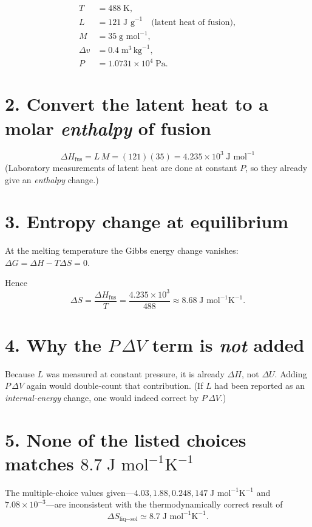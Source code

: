 \documentclass[12pt]{article}
\theoremstyle{definition} %
\theoremstyle{plain} %
\begin{document}
\[
\begin{aligned}
T &= 488\;\text{K}, \\
L &= 121\;\text{J g}^{-1}\quad\text{(latent heat of fusion)},\\
M &= 35\;\text{g mol}^{-1},\\
\Delta v &= 0.4\;\text{m}^{3}\,\text{kg}^{-1},\\
P &= 1.0731\times10^{4}\;\text{Pa}.
\end{aligned}
\]

\bigskip
\section*{2.  Convert the latent heat to a molar \emph{enthalpy} of fusion}

\[
\boxed{\;
  \Delta H_{\text{fus}}
     = L\,M
     = (121)(35)
     = 4.235\times10^{3}\;\text{J mol}^{-1}
\;}
\]
(Laboratory measurements of latent heat are done at constant \(P\), so
they already give an \emph{enthalpy} change.)

\bigskip
\section*{3.  Entropy change at equilibrium}

At the melting temperature the Gibbs energy change vanishes:
\( \Delta G = \Delta H - T\Delta S = 0\).

Hence
\[
\boxed{\;
  \Delta S = \frac{\Delta H_{\text{fus}}}{T}
           = \frac{4.235\times10^{3}}{488}
           \approx 8.68\;\text{J mol}^{-1}\text{K}^{-1}.
\;}
\]

\bigskip
\section*{4.  Why the \(P\,\Delta V\) term is \emph{not} added}

Because \(L\) was measured at constant pressure, it is already
\(\Delta H\), not \(\Delta U\).
Adding \(P\,\Delta V\) again would double‑count that contribution.
(If \(L\) had been reported as an \emph{internal‑energy} change, one
would indeed correct by \(P\,\Delta V\).)

\bigskip
\section*{5.  None of the listed choices matches \(8.7\;\text{J mol}^{-1}\text{K}^{-1}\)}

The multiple‑choice values given—\(4.03, 1.88, 0.248, 147\;\text{J mol}^{-1}\text{K}^{-1}\)
and \(7.08\times10^{-3}\)—are inconsistent with the thermodynamically
correct result of
\[
\boxed{\Delta S_{\text{liq}-\text{sol}} \simeq 8.7\;\text{J mol}^{-1}\text{K}^{-1}}.
\]
\end{document}
